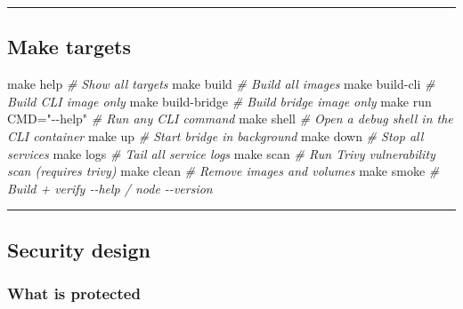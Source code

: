 \documentclass[
]{article}
\newenvironment{Shaded}{}{}
\newcommand{\CommentTok}[1]{\textcolor[rgb]{0.38,0.63,0.69}{\textit{#1}}}
\newcommand{\FunctionTok}[1]{\textcolor[rgb]{0.02,0.16,0.49}{#1}}
\newcommand{\NormalTok}[1]{#1}
\newcommand{\StringTok}[1]{\textcolor[rgb]{0.25,0.44,0.63}{#1}}
\begin{document}
\begin{center}\rule{0.5\linewidth}{0.5pt}\end{center}

\hypertarget{make-targets}{%
\subsection{Make targets}\label{make-targets}}

\begin{Shaded}
\begin{Highlighting}[]
\FunctionTok{make}\NormalTok{ help          }\CommentTok{\# Show all targets}
\FunctionTok{make}\NormalTok{ build         }\CommentTok{\# Build all images}
\FunctionTok{make}\NormalTok{ build{-}cli     }\CommentTok{\# Build CLI image only}
\FunctionTok{make}\NormalTok{ build{-}bridge  }\CommentTok{\# Build bridge image only}
\FunctionTok{make}\NormalTok{ run CMD=}\StringTok{"{-}{-}help"}  \CommentTok{\# Run any CLI command}
\FunctionTok{make}\NormalTok{ shell         }\CommentTok{\# Open a debug shell in the CLI container}
\FunctionTok{make}\NormalTok{ up            }\CommentTok{\# Start bridge in background}
\FunctionTok{make}\NormalTok{ down          }\CommentTok{\# Stop all services}
\FunctionTok{make}\NormalTok{ logs          }\CommentTok{\# Tail all service logs}
\FunctionTok{make}\NormalTok{ scan          }\CommentTok{\# Run Trivy vulnerability scan (requires trivy)}
\FunctionTok{make}\NormalTok{ clean         }\CommentTok{\# Remove images and volumes}
\FunctionTok{make}\NormalTok{ smoke         }\CommentTok{\# Build + verify {-}{-}help / node {-}{-}version}
\end{Highlighting}
\end{Shaded}

\begin{center}\rule{0.5\linewidth}{0.5pt}\end{center}

\hypertarget{security-design}{%
\subsection{Security design}\label{security-design}}

\hypertarget{what-is-protected}{%
\subsubsection{What is protected}\label{what-is-protected}}
\end{document}
